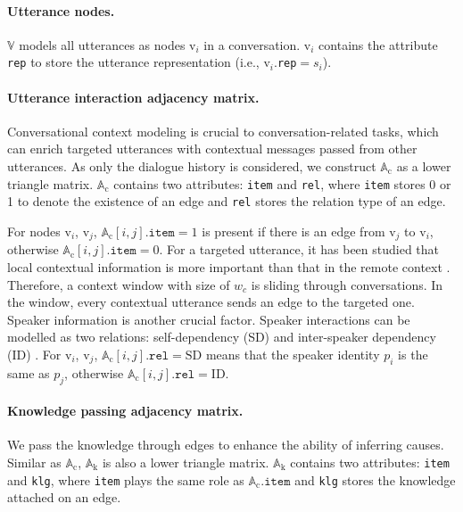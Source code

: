 \documentclass{article}
\begin{document}
\paragraph{Utterance nodes.} $\mathbb{V}$ models all utterances as nodes $\mathrm{v}_i$ in a conversation. $\mathrm{v}_i$ contains the attribute {\tt rep} to store the utterance representation (i.e., $\mathrm{v}_i.${\tt rep}$=s_i$). 

\paragraph{Utterance interaction adjacency matrix.} Conversational context modeling is crucial to conversation-related tasks, which can enrich targeted utterances with contextual messages passed from other utterances. As only the dialogue history is considered, we construct $\mathrm{\mathbb{A}_c}$ as a lower triangle matrix. $\mathrm{\mathbb{A}_c}$ contains two attributes: {\tt item} and {\tt rel}, where {\tt item} stores 0 or 1 to denote the existence of an edge and {\tt rel} stores the relation type of an edge. 

For nodes $\mathrm{v}_i$, $\mathrm{v}_j$, $\mathrm{\mathbb{A}_c}[i, j].\texttt{item}=1$ is present if there is an edge from $\mathrm{v}_j$ to $\mathrm{v}_i$, otherwise $\mathrm{\mathbb{A}_c}[i, j].\texttt{item}=0$. For a targeted utterance, it has been studied that local contextual information is more important than that in the remote context \cite{DAG}. Therefore, a context window with size of $w_c$ is sliding through conversations. In the window, every contextual utterance sends an edge to the targeted one. 
Speaker information is another crucial factor. Speaker interactions can be modelled as two relations: self-dependency (SD) and inter-speaker dependency (ID) \cite{DialogueGCN}. For $\mathrm{v}_i$, $\mathrm{v}_j$, $\mathrm{\mathbb{A}_c}[i, j].\texttt{rel}=\mathrm{SD}$ means that the speaker identity $p_i$ is the same as $p_j$, otherwise $\mathrm{\mathbb{A}_c}[i, j].\texttt{rel}=\mathrm{ID}$. 

\paragraph{Knowledge passing adjacency matrix.} We pass the knowledge through edges to enhance the ability of inferring causes. Similar as $\mathrm{\mathbb{A}_c}$, $\mathrm{\mathbb{A}_k}$ is also a lower triangle matrix. $\mathrm{\mathbb{A}_k}$ contains two attributes: {\tt item} and {\tt klg}, where {\tt item} plays the same role as $\mathrm{\mathbb{A}_c}.\texttt{item}$ and {\tt klg} stores the knowledge attached on an edge. 
\end{document}
